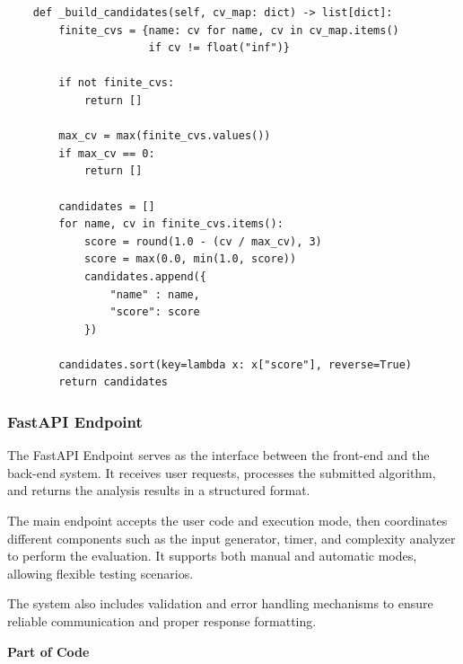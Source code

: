 \documentclass[12pt]{article}
\begin{document}
\begin{lstlisting}
    def _build_candidates(self, cv_map: dict) -> list[dict]:
        finite_cvs = {name: cv for name, cv in cv_map.items()
                      if cv != float("inf")}

        if not finite_cvs:
            return []
        
        max_cv = max(finite_cvs.values())
        if max_cv == 0:
            return []

        candidates = []
        for name, cv in finite_cvs.items():
            score = round(1.0 - (cv / max_cv), 3)
            score = max(0.0, min(1.0, score))
            candidates.append({
                "name" : name,
                "score": score
            })

        candidates.sort(key=lambda x: x["score"], reverse=True)
        return candidates
\end{lstlisting}

\newpage
\subsubsection{FastAPI Endpoint}

The FastAPI Endpoint serves as the interface between the front-end and the back-end system. It receives user requests, processes the submitted algorithm, and returns the analysis results in a structured format.

The main endpoint accepts the user code and execution mode, then coordinates different components such as the input generator, timer, and complexity analyzer to perform the evaluation. It supports both manual and automatic modes, allowing flexible testing scenarios.

The system also includes validation and error handling mechanisms to ensure reliable communication and proper response formatting.

\vspace{1cm}
\textbf{Part of Code}
\end{document}
